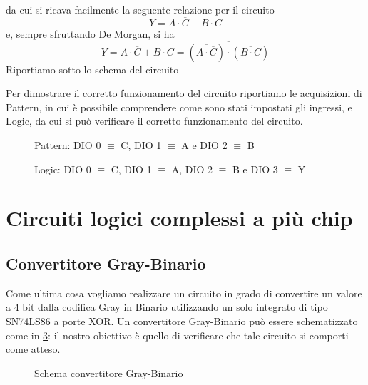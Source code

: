 \documentclass[10pt, a4paper, italian]{article}
\begin{document}
da cui si ricava facilmente la seguente relazione per il circuito
\[
Y=A\cdot\overline{C}+B\cdot C
\]
e, sempre sfruttando De Morgan, si ha
\[
Y=A\cdot\overline{C}+B\cdot C=\overline{(\overline{A\cdot\overline{C}})\cdot(\overline{B\cdot C})}
\]
Riportiamo sotto lo schema del circuito
\begin{figure}[htbp]
    \centering
    \label{circuito2}
\end{figure}

Per dimostrare il corretto funzionamento del circuito riportiamo le acquisizioni di Pattern, in cui è possibile comprendere come sono stati impostati gli ingressi, e Logic, da cui si può verificare il corretto funzionamento del circuito.
\begin{figure}[htbp]
    \centering
    \caption{Pattern: DIO 0 $\equiv$ C, DIO 1 $\equiv$ A e DIO 2 $\equiv$ B}
    \label{pat2}
\end{figure}

\begin{figure}[htbp]
    \centering
    \caption{Logic: DIO 0 $\equiv$ C, DIO 1 $\equiv$ A, DIO 2 $\equiv$ B e DIO 3 $\equiv$ Y}
\end{figure}


\section{Circuiti logici complessi a più chip}
\subsection{Convertitore Gray-Binario}
    Come ultima cosa vogliamo realizzare un circuito in grado di convertire un valore a 4 bit dalla codifica Gray in Binario utilizzando un solo integrato di tipo SN74LS86 a porte XOR.
    Un convertitore Gray-Binario può essere schematizzato come in \cref{fig: gb}: il nostro obiettivo è quello di verificare che tale circuito si comporti come atteso.
\begin{figure}[htbp]
    \caption{Schema convertitore Gray-Binario\label{fig: gb}}
\end{figure}
\end{document}
